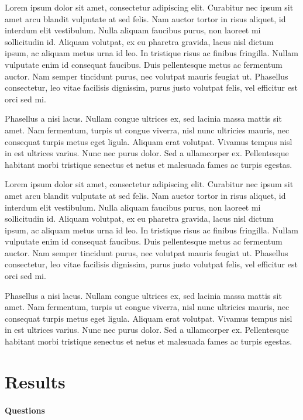 \documentclass[
]{article}
\let\oldparagraph\paragraph
\renewcommand{\paragraph}[1]{\oldparagraph{#1}\mbox{}}
\begin{document}
Lorem ipsum dolor sit amet, consectetur adipiscing elit. Curabitur nec
ipsum sit amet arcu blandit vulputate at sed felis. Nam auctor tortor in
risus aliquet, id interdum elit vestibulum. Nulla aliquam faucibus
purus, non laoreet mi sollicitudin id. Aliquam volutpat, ex eu pharetra
gravida, lacus nisl dictum ipsum, ac aliquam metus urna id leo. In
tristique risus ac finibus fringilla. Nullam vulputate enim id consequat
faucibus. Duis pellentesque metus ac fermentum auctor. Nam semper
tincidunt purus, nec volutpat mauris feugiat ut. Phasellus consectetur,
leo vitae facilisis dignissim, purus justo volutpat felis, vel efficitur
est orci sed mi.

Phasellus a nisi lacus. Nullam congue ultrices ex, sed lacinia massa
mattis sit amet. Nam fermentum, turpis ut congue viverra, nisl nunc
ultricies mauris, nec consequat turpis metus eget ligula. Aliquam erat
volutpat. Vivamus tempus nisl in est ultrices varius. Nunc nec purus
dolor. Sed a ullamcorper ex. Pellentesque habitant morbi tristique
senectus et netus et malesuada fames ac turpis egestas.

Lorem ipsum dolor sit amet, consectetur adipiscing elit. Curabitur nec
ipsum sit amet arcu blandit vulputate at sed felis. Nam auctor tortor in
risus aliquet, id interdum elit vestibulum. Nulla aliquam faucibus
purus, non laoreet mi sollicitudin id. Aliquam volutpat, ex eu pharetra
gravida, lacus nisl dictum ipsum, ac aliquam metus urna id leo. In
tristique risus ac finibus fringilla. Nullam vulputate enim id consequat
faucibus. Duis pellentesque metus ac fermentum auctor. Nam semper
tincidunt purus, nec volutpat mauris feugiat ut. Phasellus consectetur,
leo vitae facilisis dignissim, purus justo volutpat felis, vel efficitur
est orci sed mi.

Phasellus a nisi lacus. Nullam congue ultrices ex, sed lacinia massa
mattis sit amet. Nam fermentum, turpis ut congue viverra, nisl nunc
ultricies mauris, nec consequat turpis metus eget ligula. Aliquam erat
volutpat. Vivamus tempus nisl in est ultrices varius. Nunc nec purus
dolor. Sed a ullamcorper ex. Pellentesque habitant morbi tristique
senectus et netus et malesuada fames ac turpis egestas.

\hypertarget{results}{%
\section{Results}\label{results}}

\hypertarget{questions}{%
\paragraph{Questions}\label{questions}}
\end{document}
